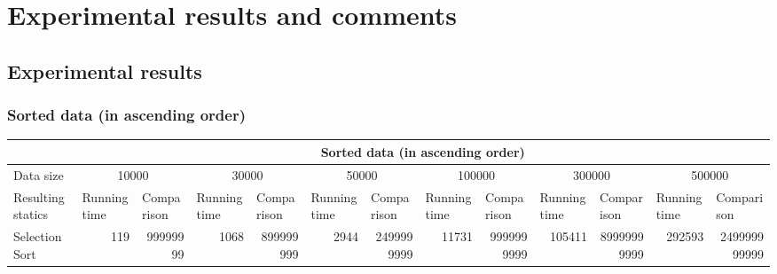 \documentclass{article}
\begin{document}
\pagebreak


\bigskip

\section{Experimental results and comments}

\subsection{Experimental results}
\subsubsection{Sorted data (in ascending order)}
\begin{table}[H]
\begin{adjustbox}{width=\columnwidth,center}
\begin{tabular}{|l|rrrrrrrrrrrr|}
\hline
                                   & \multicolumn{12}{c|}{Sorted data (in ascending order)}                                                                                                                                                                                                                                                                                                                                                                             \\ \hline
Data size                          & \multicolumn{2}{c|}{10000}                                          & \multicolumn{2}{c|}{30000}                                          & \multicolumn{2}{c|}{50000}                                          & \multicolumn{2}{c|}{100000}                                         & \multicolumn{2}{c|}{300000}                                          & \multicolumn{2}{c|}{500000}                                         \\ \hline
Resulting statics                  & \multicolumn{1}{l|}{Running time} & \multicolumn{1}{l|}{Comparison} & \multicolumn{1}{l|}{Running time} & \multicolumn{1}{l|}{Comparison} & \multicolumn{1}{l|}{Running time} & \multicolumn{1}{l|}{Comparison} & \multicolumn{1}{l|}{Running time} & \multicolumn{1}{l|}{Comparison} & \multicolumn{1}{l|}{Running time} & \multicolumn{1}{l|}{Comparison}  & \multicolumn{1}{l|}{Running time} & \multicolumn{1}{l|}{Comparison} \\ \hline
Selection Sort                     & \multicolumn{1}{r|}{119}          & \multicolumn{1}{r|}{99999999}   & \multicolumn{1}{r|}{1068}         & \multicolumn{1}{r|}{899999999}  & \multicolumn{1}{r|}{2944}         & \multicolumn{1}{r|}{2499999999} & \multicolumn{1}{r|}{11731}        & \multicolumn{1}{r|}{9999999999} & \multicolumn{1}{r|}{105411}       & \multicolumn{1}{r|}{89999999999} & \multicolumn{1}{r|}{292593}       & 249999999999                    \\ \hline

\end{tabular}
\end{adjustbox}
\end{table}
\end{document}
